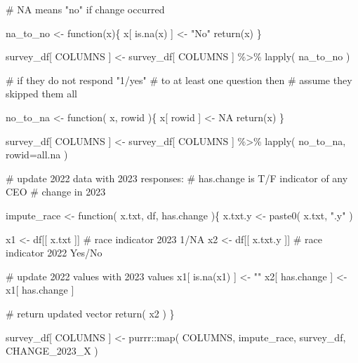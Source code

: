 \documentclass[
  letterpaper,
]{scrbook}
\newenvironment{Shaded}{\begin{snugshade}}{\end{snugshade}}
\newcommand{\AttributeTok}[1]{\textcolor[rgb]{0.40,0.45,0.13}{#1}}
\newcommand{\CommentTok}[1]{\textcolor[rgb]{0.37,0.37,0.37}{#1}}
\newcommand{\ConstantTok}[1]{\textcolor[rgb]{0.56,0.35,0.01}{#1}}
\newcommand{\ControlFlowTok}[1]{\textcolor[rgb]{0.00,0.23,0.31}{#1}}
\newcommand{\FunctionTok}[1]{\textcolor[rgb]{0.28,0.35,0.67}{#1}}
\newcommand{\NormalTok}[1]{\textcolor[rgb]{0.00,0.23,0.31}{#1}}
\newcommand{\OtherTok}[1]{\textcolor[rgb]{0.00,0.23,0.31}{#1}}
\newcommand{\SpecialCharTok}[1]{\textcolor[rgb]{0.37,0.37,0.37}{#1}}
\newcommand{\StringTok}[1]{\textcolor[rgb]{0.13,0.47,0.30}{#1}}
\begin{document}
\begin{Shaded}
\begin{Highlighting}[]
\CommentTok{\# NA means "no" if change occurred}

\NormalTok{na\_to\_no }\OtherTok{\textless{}{-}} \ControlFlowTok{function}\NormalTok{(x)\{}
\NormalTok{  x[ }\FunctionTok{is.na}\NormalTok{(x) ] }\OtherTok{\textless{}{-}} \StringTok{"No"}
  \FunctionTok{return}\NormalTok{(x)}
\NormalTok{\}}

\NormalTok{survey\_df[ COLUMNS ] }\OtherTok{\textless{}{-}} 
\NormalTok{  survey\_df[ COLUMNS ] }\SpecialCharTok{\%\textgreater{}\%} 
  \FunctionTok{lapply}\NormalTok{( na\_to\_no )}

\CommentTok{\# if they do not respond "1/yes" }
\CommentTok{\# to at least one question then}
\CommentTok{\# assume they skipped them all}

\NormalTok{no\_to\_na }\OtherTok{\textless{}{-}} \ControlFlowTok{function}\NormalTok{( x, rowid )\{}
\NormalTok{  x[ rowid ] }\OtherTok{\textless{}{-}} \ConstantTok{NA}
  \FunctionTok{return}\NormalTok{(x)}
\NormalTok{\}}

\NormalTok{survey\_df[ COLUMNS ] }\OtherTok{\textless{}{-}} 
\NormalTok{  survey\_df[ COLUMNS ] }\SpecialCharTok{\%\textgreater{}\%} 
  \FunctionTok{lapply}\NormalTok{( no\_to\_na, }\AttributeTok{rowid=}\NormalTok{all.na )}



\CommentTok{\# update 2022 data with 2023 responses: }
\CommentTok{\#   has.change is T/F indicator of any CEO}
\CommentTok{\#   change in 2023}

\NormalTok{impute\_race }\OtherTok{\textless{}{-}} \ControlFlowTok{function}\NormalTok{( x.txt, df, has.change )\{}
\NormalTok{  x.txt.y }\OtherTok{\textless{}{-}} \FunctionTok{paste0}\NormalTok{( x.txt, }\StringTok{".y"}\NormalTok{ )}
  
\NormalTok{  x1 }\OtherTok{\textless{}{-}}\NormalTok{ df[[ x.txt   ]] }\CommentTok{\# race indicator 2023 1/NA}
\NormalTok{  x2 }\OtherTok{\textless{}{-}}\NormalTok{ df[[ x.txt.y ]] }\CommentTok{\# race indicator 2022 Yes/No}
  
  \CommentTok{\# update 2022 values with 2023 values}
\NormalTok{  x1[ }\FunctionTok{is.na}\NormalTok{(x1) ] }\OtherTok{\textless{}{-}} \StringTok{""}
\NormalTok{  x2[ has.change ] }\OtherTok{\textless{}{-}}\NormalTok{ x1[ has.change ]}
  
  \CommentTok{\# return updated vector}
  \FunctionTok{return}\NormalTok{( x2 )}
\NormalTok{\}}

\NormalTok{survey\_df[ COLUMNS ] }\OtherTok{\textless{}{-}} 
\NormalTok{  purrr}\SpecialCharTok{::}\FunctionTok{map}\NormalTok{( COLUMNS, impute\_race, survey\_df, CHANGE\_2023\_X )}




\end{Highlighting}
\end{Shaded}
\end{document}
